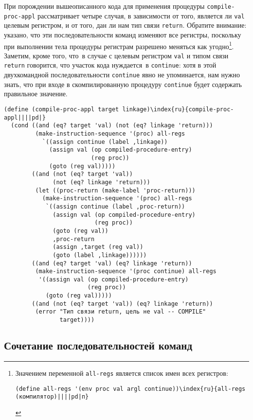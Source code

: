 При порождении вышеописанного кода для применения
процедуры {\tt com\-pile-proc-appl} рассматривает четыре случая,
в зависимости от того, является ли {\tt val} целевым регистром,
и от того, дан ли нам тип связи {\tt return}.  Обратите внимание:
указано, что эти последовательности команд изменяют все регистры,
поскольку при выполнении тела процедуры регистрам разрешено меняться
как угодно\footnote{Значением переменной {\tt all-regs} является
список имен всех регистров:
{\sloppy

}
\begin{Verbatim}
(define all-regs '(env proc val argl continue))\index{ru}{all-regs (компилятор)||||pd|п}
\end{Verbatim}
}. %
Заметим, кроме того, что~в случае с целевым регистром 
{\tt val} и типом связи {\tt return} говорится, что
участок кода нуждается~в {\tt continue}: хотя в
этой двухкомандной последовательности {\tt continue} явно не
упоминается, нам нужно знать, что при входе в
скомпилированную процедуру {\tt continue} будет содержать
правильное значение.

\begin{Verbatim}[fontsize=\small]
(define (compile-proc-appl target linkage)\index{ru}{compile-proc-appl||||pd|}
  (cond ((and (eq? target 'val) (not (eq? linkage 'return)))
         (make-instruction-sequence '(proc) all-regs
           `((assign continue (label ,linkage))
             (assign val (op compiled-procedure-entry)
                         (reg proc))
             (goto (reg val)))))
        ((and (not (eq? target 'val))
              (not (eq? linkage 'return)))
         (let ((proc-return (make-label 'proc-return)))
           (make-instruction-sequence '(proc) all-regs
            `((assign continue (label ,proc-return))
              (assign val (op compiled-procedure-entry)
                          (reg proc))
              (goto (reg val))
              ,proc-return
              (assign ,target (reg val))
              (goto (label ,linkage))))))
        ((and (eq? target 'val) (eq? linkage 'return))
         (make-instruction-sequence '(proc continue) all-regs
          '((assign val (op compiled-procedure-entry)
                        (reg proc))
            (goto (reg val)))))
        ((and (not (eq? target 'val)) (eq? linkage 'return))
         (error "Тип связи return, цель не val -- COMPILE"
                target))))
\end{Verbatim}
\subsection{Сочетание последовательностей команд}
\label{COMBINING-INSTRUCTION-SEQUENCES}


